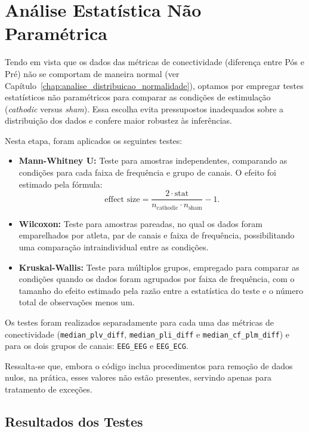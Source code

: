 \chapter{Análise Estatística Não Paramétrica}
\label{chap:analise_estatistica_np}

Tendo em vista que os dados das métricas de conectividade (diferença entre Pós e Pré) não se comportam de maneira normal (ver Capítulo~\ref{chap:analise_distribuicao_normalidade}), optamos por empregar testes estatísticos não paramétricos para comparar as condições de estimulação (\texorpdfstring{\textit{cathodic} versus \textit{sham}}{cathodic versus sham}). Essa escolha evita pressupostos inadequados sobre a distribuição dos dados e confere maior robustez às inferências.

Nesta etapa, foram aplicados os seguintes testes:
\begin{itemize}
    \item \textbf{Mann-Whitney U:} Teste para amostras independentes, comparando as condições para cada faixa de frequência e grupo de canais. O efeito foi estimado pela fórmula:
    \[
    \text{effect size} = \frac{2\cdot \text{stat}}{n_{\text{cathodic}} \cdot n_{\text{sham}}} - 1.
    \]
    \item \textbf{Wilcoxon:} Teste para amostras pareadas, no qual os dados foram emparelhados por atleta, par de canais e faixa de frequência, possibilitando uma comparação intraindividual entre as condições.
    \item \textbf{Kruskal-Wallis:} Teste para múltiplos grupos, empregado para comparar as condições quando os dados foram agrupados por faixa de frequência, com o tamanho do efeito estimado pela razão entre a estatística do teste e o número total de observações menos um.
\end{itemize}

Os testes foram realizados separadamente para cada uma das métricas de conectividade 
(\texttt{median\_plv\_diff}, \texttt{median\_pli\_diff} e \texttt{median\_cf\_plm\_diff}) 
e para os dois grupos de canais: \texttt{EEG\_EEG} e \texttt{EEG\_ECG}. 

Ressalta-se que, embora o código inclua procedimentos para remoção de dados nulos, 
na prática, esses valores não estão presentes, servindo apenas para tratamento de exceções.

\section{Resultados dos Testes}

